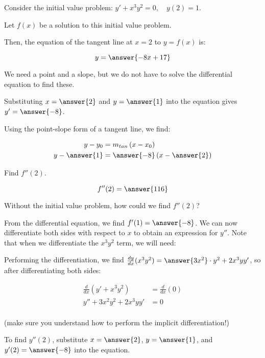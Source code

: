 \documentclass{ximera}
\author{Jim Talamo}
\begin{document}
\begin{exercise}
Consider the initial value problem: $y' +x^3y^2 = 0, \quad y(2)=1$.

Let $f(x)$ be a solution to this initial value problem.

Then, the equation of the tangent line at $x=2$ to $y=f(x)$ is:

\[
y = \answer{-8x+17}
\]

\begin{hint}
We need a point and a slope, but we do not have to solve the differential equation to find these.

Substituting $x=\answer{2}$ and $y=\answer{1}$ into the equation gives $y' = \answer{-8}$.  

Using the point-slope form of a tangent line, we find:

\begin{align*}
y-y_0 &= m_{tan} \left(x-x_0\right) \\
y-\answer{1} &= \answer{-8} \left(x-\answer{2}\right)
\end{align*}
\end{hint}

\begin{exercise}

Find $f''(2)$.

\[
f''(2) = \answer{116 }
\]
\begin{hint}
Without the initial value problem, how could we find $f''(2)$?

\begin{multipleChoice}
\end{multipleChoice}

From the differential equation, we find $f'(1) = \answer{-8}$.  We can now differentiate both sides with respect to $x$ to obtain an expression for $y''$.  Note that when we differentiate the $x^3y^2$ term, we will need:

\begin{selectAll}
\end{selectAll}

Performing the differentiation, we find $\frac{dy}{dx} (x^3y^2) = \answer{3x^2} \cdot y^2 + 2x^3yy'$, so after differentiating both sides:

\begin{align*}
\frac{d}{dx}(y' +x^3y^2) &= \frac{d}{dx}(0) \\
y''+3x^2y^2+2x^3yy' &= 0\\
\end{align*}

(make sure you understand how to perform the implicit differentiation!)

To find $y''(2)$, substitute $x=\answer{2}$, $y=\answer{1}$, and $y'(2) = \answer{-8}$ into the equation.
\end{hint}

\end{exercise}
\end{exercise}
\end{document}
